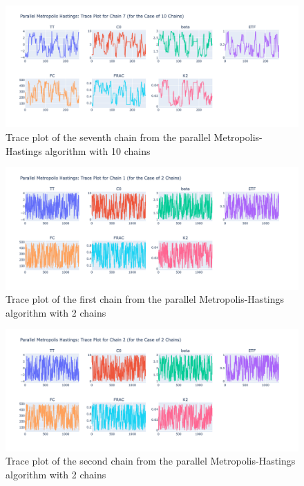 \begin{figure}[H]
    \centering
    \includegraphics[width=1\textwidth]{figures/parallel_mh/tp_rand_10_7.png}
    \captionsetup{width=.8\textwidth}
    \caption{Trace plot of the seventh chain from the parallel Metropolis-Hastings algorithm with 10 chains}
    \label{fig:enter-label}
\end{figure}

\begin{figure}[H]
    \centering
    \includegraphics[width=1\textwidth]{figures/parallel_mh/tp_rand_2_1.png}
    \captionsetup{width=.8\textwidth}
    \caption{Trace plot of the first chain from the parallel Metropolis-Hastings algorithm with 2 chains}
    \label{fig:enter-label}
\end{figure}

\begin{figure}[H]
    \centering
    \includegraphics[width=1\textwidth]{figures/parallel_mh/tp_rand_2_2.png}
    \captionsetup{width=.8\textwidth}
    \caption{Trace plot of the second chain from the parallel Metropolis-Hastings algorithm with 2 chains}
    \label{fig:enter-label}
\end{figure}



